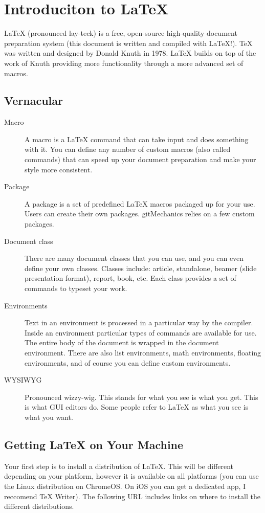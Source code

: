 \section{Introduciton to \LaTeX{}}
\LaTeX{} (pronounced lay-teck) is a free, open-source high-quality document preparation system (this document is written and compiled with \LaTeX{}!). \TeX{} was written and designed by Donald Knuth in 1978. \LaTeX{} builds on top of the work of Knuth providing more functionality through a more advanced set of macros.

\subsection{Vernacular}

\begin{description}
	\item[Macro] A macro is a \LaTeX{} command that can take input and does something with it. You can define any number of custom macros (also called commands) that can speed up your document preparation and make your style more consistent.
	\item[Package] A package is a set of predefined \LaTeX{} macros packaged up for your use. Users can create their own packages. gitMechanics relies on a few custom packages.
	\item[Document class] There are many document classes that you can use, and you can even define your own classes. Classes include: article, standalone, beamer (slide presentation format), report, book, etc. Each class provides a set of commands to typeset your work.
	\item[Environments] Text in an environment is processed in a particular way by the compiler. Inside an environment particular types of commands are available for use. The entire body of the document is wrapped in the document environment. There are also list environments, math environments, floating environments, and of course you can define custom environments.
	\item[WYSIWYG] Pronounced wizzy-wig. This stands for what you see is what you get. This is what GUI editors do. Some people refer to \LaTeX{} as what you see is what you want.
\end{description}

\subsection{Getting \LaTeX{} on Your Machine}
Your first step is to install a distribution of \LaTeX{}. This will be different depending on your platform, however it is available on all platforms (you can use the Linux distribution on ChromeOS. On iOS you can get a dedicated app, I reccomend TeX Writer). The following URL includes links on where to install the different distributions.

